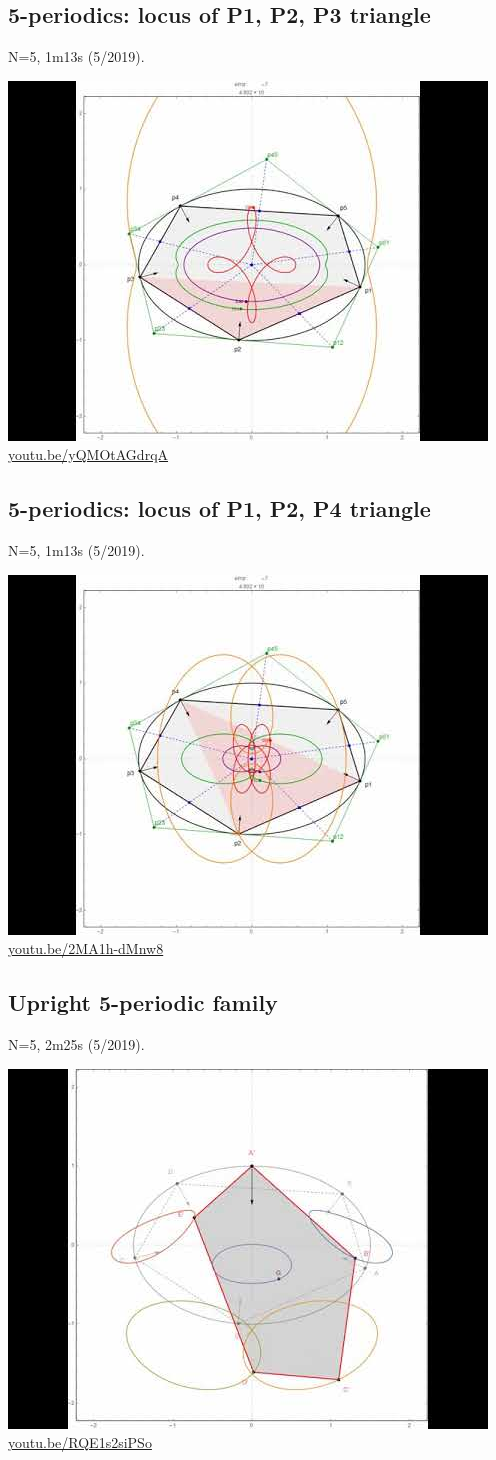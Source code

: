 \documentclass[12pt]{amsart}
\begin{document}
\subsection{5-periodics: locus of P1, P2, P3 triangle}
\label{vid:yQMOtAGdrqA}
\noindent N=5, 1m13s (5/2019). 
\begin{center}\includegraphics[width=.5\textwidth]{pics/yQMOtAGdrqA.jpg} \\ 
\href{https://youtu.be/yQMOtAGdrqA}{\url{youtu.be/yQMOtAGdrqA}}\end{center}
% 

\subsection{5-periodics: locus of P1, P2, P4 triangle}
\label{vid:2MA1h-dMnw8}
\noindent N=5, 1m13s (5/2019). 
\begin{center}\includegraphics[width=.5\textwidth]{pics/2MA1h-dMnw8.jpg} \\ 
\href{https://youtu.be/2MA1h-dMnw8}{\url{youtu.be/2MA1h-dMnw8}}\end{center}
% 

\subsection{Upright 5-periodic family}
\label{vid:RQE1s2siPSo}
\noindent N=5, 2m25s (5/2019). 
\begin{center}\includegraphics[width=.5\textwidth]{pics/RQE1s2siPSo.jpg} \\ 
\href{https://youtu.be/RQE1s2siPSo}{\url{youtu.be/RQE1s2siPSo}}\end{center}
% 
\end{document}
